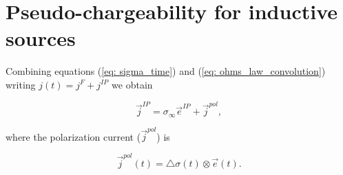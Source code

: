 \documentclass[extra,mreferee]{gji}
\newcommand{\siginf}{\sigma_\infty}
\newcommand{\dsig}{\triangle\sigma}
\renewcommand {\j}  { {\vec j} }
\newcommand {\e}  { {\vec e} }
\begin{document}
\section{Pseudo-chargeability for inductive sources}
Combining equations (\ref{eq: sigma_time}) and  (\ref{eq: ohms_law_convolution}) writing $j(t)=j^F + j^{IP}$ we obtain
\begin{linenomath*}
\begin{equation}
  \j^{IP} = \siginf \e^{IP} + \j^{pol},
  \label{eq:IP_current}
\end{equation}
\end{linenomath*}
where the polarization current ($\j^{pol}$) is
\begin{linenomath*}
\begin{equation}
  \j^{pol}(t) = \dsig(t) \otimes \e(t).
  \label{eq:polarization_current}
\end{equation}
\end{linenomath*}
\end{document}
